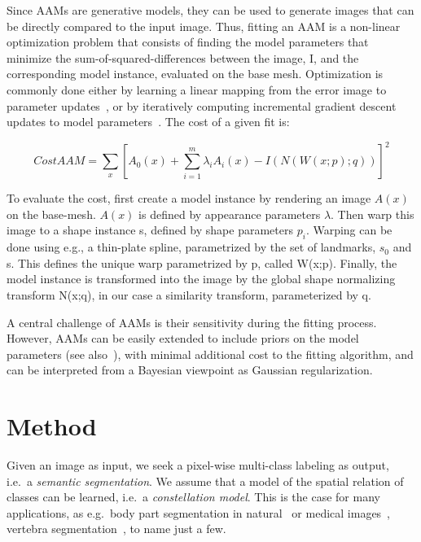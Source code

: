 \documentclass[10pt,twocolumn,letterpaper]{article}
\begin{document}
Since AAMs are generative models, they can be used to generate images that can be directly compared to the input image.  Thus, fitting an AAM is a non-linear optimization problem that consists of finding the model parameters that minimize the sum-of-squared-differences between the image, I, and the corresponding model instance, evaluated on the base mesh.  Optimization is commonly done either by learning a linear mapping from the error image to parameter updates~\cite{CootesAAM2001}, or by iteratively computing incremental gradient descent updates to model parameters~\cite{BakerAAM2004}.  The cost of a given fit is:

\begin{equation}
CostAAM = \sum_{x} [A_0(x) + \sum_{i=1}^m \lambda_i A_i(x) - I(N(W(x;p);q))]^2
\label{eq:costAAM}
\end{equation} 

To evaluate the cost, first create a model instance by rendering an image $A(x)$ on the base-mesh. $A(x)$ is defined by appearance parameters $\lambda$. Then warp this image to a shape instance s, defined by shape parameters $p_i$.  Warping can be done using e.g., a thin-plate spline, parametrized by the set of landmarks, $s_0$ and s. This defines the unique warp parametrized by p, called W(x;p).  Finally, the model instance is transformed into the image by the global shape normalizing transform N(x;q), in our case a similarity transform, parameterized by q.

A central challenge of AAMs is their sensitivity during the fitting process. 
However, AAMs can be easily extended to include priors on the model parameters (see also~\cite{BakerAAM2004}), with minimal additional cost to the fitting algorithm, and can be interpreted from a Bayesian viewpoint as Gaussian regularization.
%



\section{Method}
\label{sec:method}
Given an image as input, we seek a pixel-wise multi-class labeling as output, i.e.\ a \emph{semantic segmentation}. 
%
We assume that a model of the spatial relation of classes can be learned, i.e.\ a \emph{constellation model}. This is the case for many applications, as e.g.\ body part segmentation in natural~\cite{PoseMachinesECCV2014} or medical images~\cite{SeifertAnatomicalSPIE2009}, vertebra segmentation~\cite{Glocker2012,Glocker2013}, to name just a few. 
%
\end{document}

